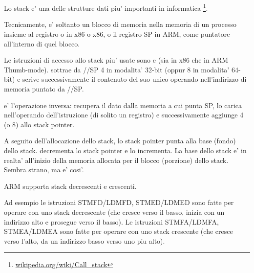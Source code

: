 \chapter{\Stack}
\label{sec:stack}
\myindex{\Stack}

Lo stack e' una delle strutture dati piu' importanti in informatica
\footnote{\href{http://go.yurichev.com/17119}{wikipedia.org/wiki/Call\_stack}}.

Tecnicamente, e' soltanto un blocco di memoria nella memoria di un processo insieme al registro \ESP o \RSP in x86 o x86, o il registro \ac{SP} in ARM, come puntatore all'interno di quel blocco.

Le istruzioni di accesso allo stack piu' usate sono \PUSH e \POP (sia in x86 che in ARM Thumb-mode).
\PUSH sottrae da \ESP/\RSP/\ac{SP} 4 in modalita' 32-bit (oppur 8 in modalita' 64-bit) e scrive successivamente il contenuto del suo unico operando nell'indirizzo di memoria puntato da \ESP/\RSP/\ac{SP}.


\POP e' l'operazione inversa: recupera il dato dalla memoria a cui punta \ac{SP}, lo carica nell'operando dell'istruzione (di solito un registro)
e successivamente aggiunge 4 (o 8) allo \gls{stack pointer}.

A seguito dell'allocazione dello stack, lo \gls{stack pointer} punta alla base (fondo) dello stack.
\PUSH decrementa lo \gls{stack pointer} e \POP lo incrementa.
La base dello stack e' in realta' all'inizio della memoria allocata per il blocco (porzione) dello stack. Sembra strano, ma e' cosi'.


\ifdefined\IncludeARM
ARM supporta stack decrescenti e crescenti.


Ad esempio le istruzioni \ac{STMFD}/\ac{LDMFD}, \ac{STMED}/\ac{LDMED} sono fatte per operare con uno stack decrescente (che cresce verso il basso, inizia con un indirizzo alto e prosegue verso il basso).
Le istruzioni \ac{STMFA}/\ac{LDMFA}, \ac{STMEA}/\ac{LDMEA} sono fatte per operare con uno stack crescente (che cresce verso l'alto, da un indirizzo basso verso uno piu alto).
\fi


